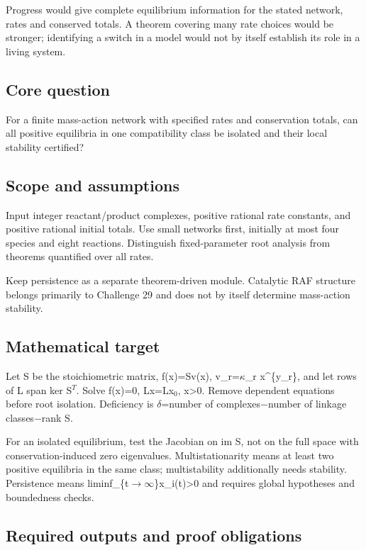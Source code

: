 \documentclass[
  11pt,
]{article}
\begin{document}
Progress would give complete equilibrium information for the stated
network, rates and conserved totals. A theorem covering many rate
choices would be stronger; identifying a switch in a model would not by
itself establish its role in a living system.

\subsection{Core question}

For a finite mass-action network with specified rates and conservation
totals, can all positive equilibria in one compatibility class be
isolated and their local stability certified?

\subsection{Scope and assumptions}

Input integer reactant/product complexes, positive rational rate
constants, and positive rational initial totals. Use small networks
first, initially at most four species and eight reactions. Distinguish
fixed-parameter root analysis from theorems quantified over all rates.

Keep persistence as a separate theorem-driven module. Catalytic RAF
structure belongs primarily to Challenge 29 and does not by itself
determine mass-action stability.

\subsection{Mathematical target}

Let S be the stoichiometric matrix, f(x)=Sv(x),
v\_r=\ensuremath{\kappa}\_r x\^{}\{y\_r\}, and let rows of L span ker
S\ensuremath{{}^{T}}. Solve f(x)=0, Lx=Lx\ensuremath{{}_{0}},
x\textgreater0. Remove dependent equations before root isolation.
Deficiency is \ensuremath{\delta}=number of
complexes\ensuremath{-}number of linkage classes\ensuremath{-}rank S.

For an isolated equilibrium, test the Jacobian on im S, not on the full
space with conservation-induced zero eigenvalues. Multistationarity
means at least two positive equilibria in the same class; multistability
additionally needs stability. Persistence means
liminf\_\{t\ensuremath{\to}\ensuremath{\infty}\}x\_i(t)>0 and requires
global hypotheses and boundedness checks.

\subsection{Required outputs and proof obligations}
\end{document}
